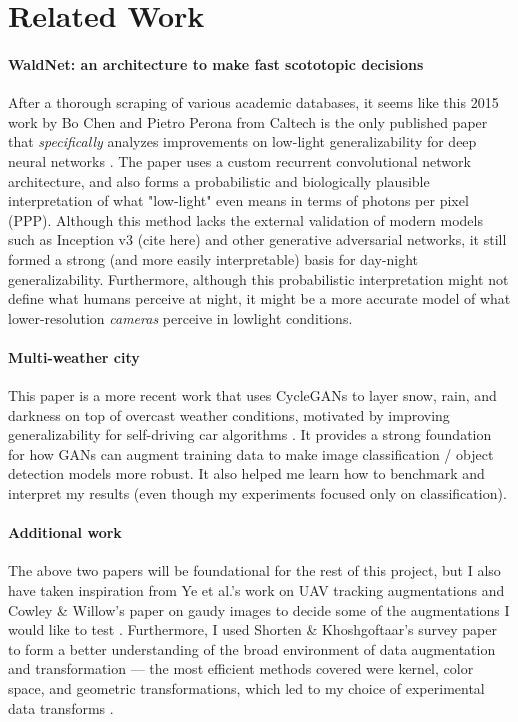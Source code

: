 \documentclass{article}
\begin{document}
\section{Related Work}
\paragraph{WaldNet: an architecture to make fast scototopic decisions}
\label{subsection:waldnet}
After a thorough scraping of various academic databases, it seems like this 2015 work by Bo Chen and Pietro Perona from Caltech is the only published paper that \textit{specifically} analyzes improvements on low-light generalizability for deep neural networks \cite{chenScotopic2015}. The paper uses a custom recurrent convolutional network architecture, and also forms a probabilistic and biologically plausible interpretation of what "low-light" even means in terms of photons per pixel (PPP). Although this method lacks the external validation of modern models such as Inception v3 (cite here) and other generative adversarial networks, it still formed a strong (and more easily interpretable) basis for day-night generalizability. Furthermore, although this probabilistic interpretation might not define what humans perceive at night, it might be a more accurate model of what lower-resolution \textit{cameras} perceive in lowlight conditions.
\paragraph{Multi-weather city}
\label{subsection:mwc}
This paper is a more recent work that uses CycleGANs to layer snow, rain, and darkness on top of overcast weather conditions, motivated by improving generalizability for self-driving car algorithms \cite{multiweather2021}. It  provides a strong foundation for how GANs can augment training data to make image classification / object detection models more robust. It also helped me learn how to benchmark and interpret my results (even though my experiments focused only on classification). 


\paragraph{Additional work} The above two papers will be foundational for the rest of this project, but I also have taken inspiration from Ye et al.'s work on UAV tracking augmentations and Cowley \& Willow's paper on gaudy images to decide some of the augmentations I would like to test \cite{darkLighter2021, cowleyGaudy2020}. Furthermore, I used Shorten \& Khoshgoftaar's survey paper to form a better understanding of the broad environment of data augmentation and transformation --- the most efficient methods covered were kernel, color space, and geometric transformations, which led to my choice of experimental data transforms \cite{surveyDataAugmentation}.
\end{document}
